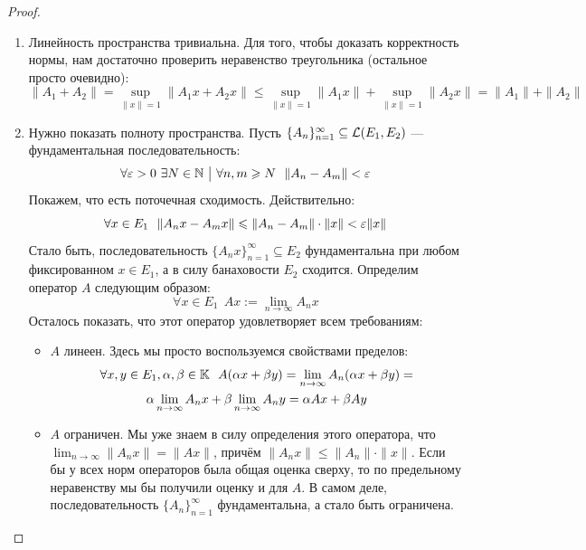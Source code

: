 \begin{proof}~
	\begin{enumerate}
		\item Линейность пространства тривиальна. Для того, чтобы доказать корректность нормы, нам достаточно проверить неравенство треугольника (остальное просто очевидно):
		\[
			\|A_1 + A_2\| = \sup_{\|x\| = 1} \|A_1x + A_2x\| \le \sup_{\|x\| = 1} \|A_1x\| + \sup_{\|x\| = 1} \|A_2x\| = \|A_1\| + \|A_2\|
		\]
		
		\item Нужно показать полноту пространства. Пусть $\{A_n\}_{n = 1}^\infty \subseteq \mathcal{L}(E_1, E_2)$ --- фундаментальная последовательность:
		\[
			\forall \varepsilon > 0\ \exists N \in \mathbb{N} \ \big|\  \forall n, m \geqslant N\ \ \|A_n - A_m\| < \varepsilon
		\]
		Покажем, что есть поточечная сходимость. Действительно:
		\[
			\forall x \in E_1\ \ \|A_nx - A_mx\| \leqslant \|A_n - A_m\| \cdot \|x\| < \varepsilon \|x\|
		\]
		Стало быть, последовательность $\{A_nx\}_{n = 1}^\infty \subseteq E_2$ фундаментальна при любом фиксированном $x \in E_1$, а в силу банаховости $E_2$ сходится. Определим оператор $A$ следующим образом:
		\[
			\forall x \in E_1\ \ Ax := \lim_{n \to \infty} A_nx
		\]
		Осталось показать, что этот оператор удовлетворяет всем требованиям:
		\begin{itemize}
			\item $A$ линеен. Здесь мы просто воспользуемся свойствами пределов:
			\begin{multline*}
				\forall x, y \in E_1, \alpha, \beta \in \mathbb{K}\ \ A(\alpha x + \beta y) = \lim_{n \to \infty} A_n(\alpha x + \beta y) =
				\\
				\alpha \lim_{n \to \infty} A_nx + \beta \lim_{n \to \infty} A_ny = \alpha Ax + \beta Ay
			\end{multline*}
			
			\item $A$ ограничен. Мы уже знаем в силу определения этого оператора, что \\ $\lim_{n \to \infty} \|A_nx\| = \|Ax\|$, причём $\|A_nx\| \le \|A_n\| \cdot \|x\|$. Если бы у всех норм операторов была общая оценка сверху, то по предельному неравенству мы бы получили оценку и для $A$. В самом деле, последовательность $\{A_n\}_{n = 1}^\infty$ фундаментальна, а стало быть ограничена.
			

\end{itemize}
\end{enumerate}
\end{proof}
